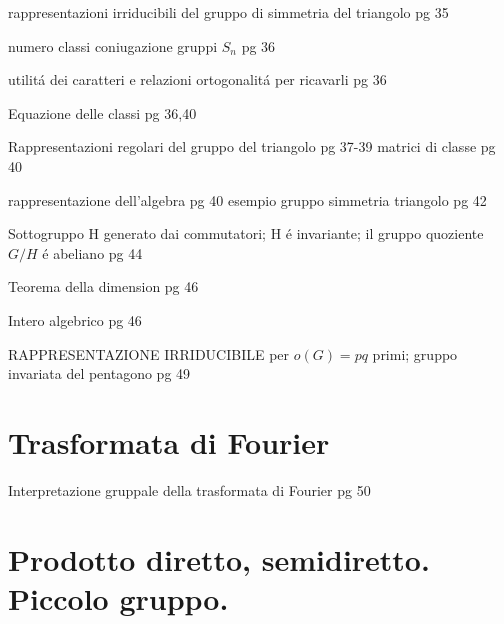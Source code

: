 \documentclass[oneside,12pt]{memoir}
\begin{document}
\begin{itemize*}
\item rappresentazioni irriducibili del gruppo di simmetria del triangolo pg 35
\item numero classi coniugazione gruppi  $S_n$ pg 36
\item utilit\'a dei caratteri e relazioni ortogonalit\'a per ricavarli pg 36
\item Equazione delle classi pg 36,40
\item Rappresentazioni regolari del gruppo del triangolo pg 37-39
matrici di classe pg 40
\item rappresentazione dell'algebra pg 40
esempio gruppo simmetria triangolo pg 42
\item Sottogruppo H generato dai commutatori; H \'e invariante; il gruppo quoziente $G/H$ \'e abeliano pg 44
\item Teorema della dimension pg 46
\item Intero algebrico pg 46
\item RAPPRESENTAZIONE IRRIDUCIBILE per $o(G)=pq$  primi; gruppo invariata del pentagono pg 49
\end{itemize*}

\section{Trasformata di Fourier}

\begin{itemize*}
\item Interpretazione gruppale della trasformata di Fourier pg 50
\end{itemize*}

\section{Prodotto diretto, semidiretto. Piccolo gruppo.}
\end{document}
